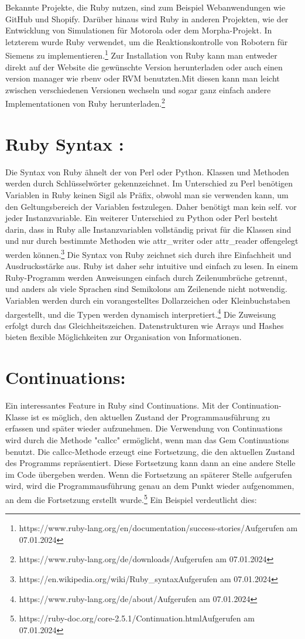 \documentclass{article}
\begin{document}
Bekannte Projekte, die Ruby nutzen, sind zum Beispiel Webanwendungen wie GitHub und Shopify. Darüber hinaus wird Ruby in anderen Projekten, wie der Entwicklung von Simulationen für Motorola oder dem Morpha-Projekt. In letzterem wurde Ruby verwendet, um die Reaktionskontrolle von Robotern für Siemens zu implementieren.\footnote{https://www.ruby-lang.org/en/documentation/success-stories/Aufgerufen am 07.01.2024}
Zur Installation von Ruby kann man entweder direkt auf der Website die gewünschte Version herunterladen oder auch einen version manager wie rbenv oder RVM benutzten.Mit diesen kann man leicht zwischen verschiedenen Versionen wechseln und sogar ganz einfach andere Implementationen von Ruby herunterladen.\footnote{https://www.ruby-lang.org/de/downloads/Aufgerufen am 07.01.2024}
\section*{
Ruby Syntax :}

Die Syntax von Ruby ähnelt der von Perl oder Python. Klassen und Methoden werden durch Schlüsselwörter gekennzeichnet. Im Unterschied zu Perl benötigen Variablen in Ruby keinen Sigil als Präfix, obwohl man sie verwenden kann, um den Geltungsbereich der Variablen festzulegen. Daher benötigt man kein self. vor jeder Instanzvariable.
Ein weiterer Unterschied zu Python oder Perl besteht darin, dass in Ruby alle Instanzvariablen vollständig privat für die Klassen sind und nur durch bestimmte Methoden wie attr\_writer oder attr\_reader offengelegt werden können.\footnote{https://en.wikipedia.org/wiki/Ruby\_syntaxAufgerufen am 07.01.2024}
Die Syntax von Ruby zeichnet sich durch ihre Einfachheit und Ausdrucksstärke aus. Ruby ist daher sehr intuitive und einfach zu lesen. In einem Ruby-Programm werden Anweisungen einfach durch Zeilenumbrüche getrennt, und anders als viele Sprachen sind Semikolons am Zeilenende nicht notwendig.
Variablen werden durch ein vorangestelltes Dollarzeichen oder Kleinbuchstaben dargestellt, und die Typen werden dynamisch interpretiert.\footnote{https://www.ruby-lang.org/de/about/Aufgerufen am 07.01.2024} Die Zuweisung erfolgt durch das Gleichheitszeichen. Datenstrukturen wie Arrays und Hashes bieten flexible Möglichkeiten zur Organisation von Informationen.
\section*{ Continuations:}
Ein interessantes Feature in Ruby sind Continuations. Mit der Continuation-Klasse ist es möglich, den aktuellen Zustand der Programmausführung zu erfassen und später wieder aufzunehmen. Die Verwendung von Continuations wird durch die Methode "callcc" ermöglicht, wenn man das Gem Continuations benutzt. Die callcc-Methode erzeugt eine Fortsetzung, die den aktuellen Zustand des Programms repräsentiert. Diese Fortsetzung kann dann an eine andere Stelle im Code übergeben werden. Wenn die Fortsetzung an späterer Stelle aufgerufen wird, wird die Programmausführung genau an dem Punkt wieder aufgenommen, an dem die Fortsetzung erstellt wurde.\footnote{https://ruby-doc.org/core-2.5.1/Continuation.htmlAufgerufen am 07.01.2024} Ein Beispiel verdeutlicht dies: \\ 
\end{document}
